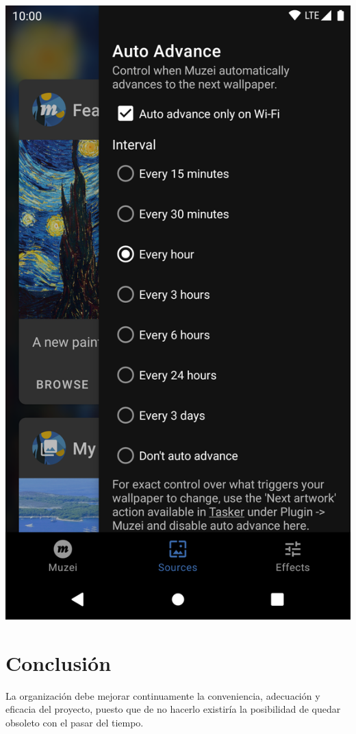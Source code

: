 \documentclass[12pt,a4paper]{article}
\begin{document}
{\begin{prueba}
\includegraphics[scale=0.2]{prueba.png}
\end{prueba}

\section{Conclusión}
La organización debe mejorar continuamente la conveniencia, adecuación y eficacia del proyecto, puesto que de no hacerlo existiría la posibilidad de quedar obsoleto con el pasar del tiempo.

}
\end{document}
